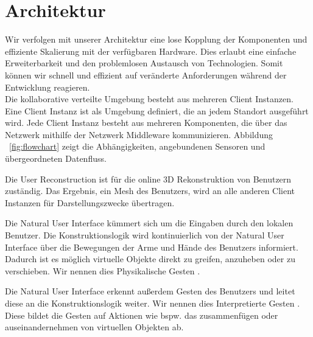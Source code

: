 \newcommand{\concept}{\textit{Konzept: }}
\newcommand{\currentState}{\textit{Aktueller Stand: }}
\newcommand{\openQuestions}{\textit{Nächste Schritte: }}

\newcommand{\visualization}{Visualisierung }
\newcommand{\constructionLogic}{Konstruktionslogik }
\newcommand{\gestureRecognition}{Natural User Interface }
\newcommand{\mobileDeviceComponent}{Mobile Device }
\newcommand{\netWorkMiddleware}{Netzwerk Middleware }
\newcommand{\userReconstruction}{User Reconstruction }

\newcommand{\mobileDevice}{See-Through AR-Brille }
\newcommand{\physicalGestures}{Physikalische Gesten }
\newcommand{\interpretedGestures}{Interpretierte Gesten }

\section{Architektur} \label{sec:architecture}

Wir verfolgen mit unserer Architektur eine lose Kopplung der Komponenten und 
effiziente Skalierung mit der verfügbaren Hardware. Dies erlaubt eine einfache
Erweiterbarkeit und den problemlosen Austausch von Technologien. Somit können
wir schnell und effizient auf veränderte Anforderungen während der Entwicklung
reagieren.\\

Die kollaborative verteilte Umgebung besteht aus mehreren Client Instanzen. Eine
Client Instanz ist als Umgebung definiert, die an jedem Standort ausgeführt
wird. Jede Client Instanz besteht aus mehreren Komponenten, die über das
Netzwerk mithilfe der \netWorkMiddleware kommunizieren.
Abbildung ~\ref{fig:flowchart} zeigt die Abhängigkeiten, angebundenen Sensoren
und übergeordneten Datenfluss.

Die \userReconstruction ist für die online 3D Rekonstruktion von Benutzern
zuständig. Das Ergebnis, ein Mesh des Benutzers, wird an alle anderen Client
Instanzen für Darstellungszwecke übertragen.

Die \gestureRecognition kümmert sich um die Eingaben durch den lokalen Benutzer.
Die \constructionLogic wird kontinuierlich von der \gestureRecognition über die
Bewegungen der Arme und Hände des Benutzers informiert. Dadurch ist es möglich
virtuelle Objekte direkt zu greifen, anzuheben oder zu verschieben. Wir nennen
dies \physicalGestures.

Die \gestureRecognition erkennt außerdem Gesten des Benutzers und leitet diese
an die \constructionLogic weiter. Wir nennen dies \interpretedGestures. Diese
bildet die Gesten auf Aktionen wie bspw. das zusammenfügen oder
auseinandernehmen von virtuellen Objekten ab.


